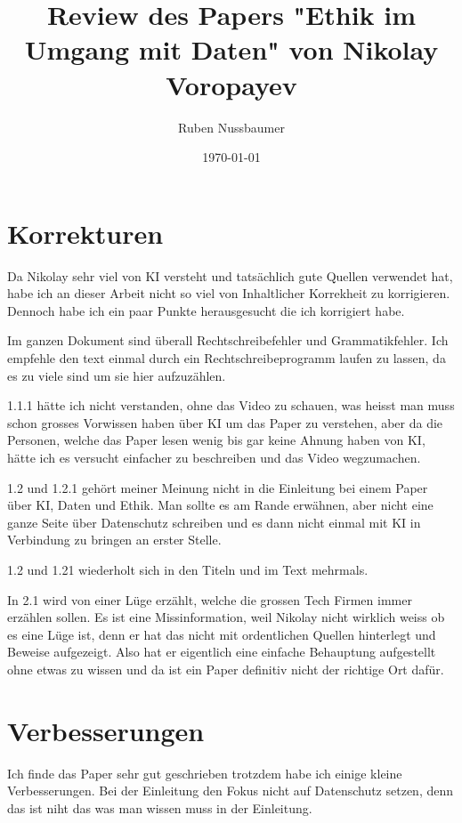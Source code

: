 \documentclass{article}
\title{Review des Papers "Ethik im Umgang mit Daten" von Nikolay Voropayev}
\author{Ruben Nussbaumer}
\date{\today}
\begin{document}
\maketitle


\newpage

\section{Korrekturen}

Da Nikolay sehr viel von KI versteht und tatsächlich gute Quellen verwendet hat, habe ich an dieser Arbeit nicht so viel von Inhaltlicher Korrekheit zu korrigieren. Dennoch habe ich ein paar Punkte herausgesucht die ich korrigiert habe.

Im ganzen Dokument sind überall Rechtschreibefehler und Grammatikfehler. 
Ich empfehle den text einmal durch ein Rechtschreibeprogramm laufen zu lassen, da es zu viele sind um sie hier aufzuzählen.

1.1.1 hätte ich nicht verstanden, ohne das Video zu schauen, was heisst man muss schon grosses Vorwissen haben über KI um das Paper zu verstehen, aber da die Personen, welche das Paper lesen wenig bis gar keine Ahnung haben von KI, hätte ich es versucht einfacher zu beschreiben und das Video wegzumachen.

1.2 und 1.2.1 gehört meiner Meinung nicht in die Einleitung bei einem Paper über KI, Daten und Ethik. Man sollte es am Rande erwähnen, aber nicht eine ganze Seite über Datenschutz schreiben und es dann nicht einmal mit KI in Verbindung zu bringen an erster Stelle.

1.2 und 1.21 wiederholt sich in den Titeln und im Text mehrmals.

In 2.1 wird von einer Lüge erzählt, welche die grossen Tech Firmen immer erzählen sollen. Es ist eine Missinformation, weil Nikolay nicht wirklich weiss ob es eine Lüge ist, denn er hat das nicht mit ordentlichen Quellen hinterlegt und Beweise aufgezeigt. Also hat er eigentlich eine einfache Behauptung aufgestellt ohne etwas zu wissen und da ist ein Paper definitiv nicht der richtige Ort dafür.

\section{Verbesserungen}
Ich finde das Paper sehr gut geschrieben trotzdem habe ich einige kleine Verbesserungen.
Bei der Einleitung den Fokus nicht auf Datenschutz setzen, denn das ist niht das was man wissen muss in der Einleitung.
\end{document}
